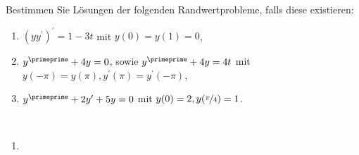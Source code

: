 \begin{exercise}
Bestimmen Sie Lösungen der folgenden Randwertprobleme, falls diese existieren:
\begin{enumerate}[label = \textbf{\alph*)}]
  \item $(yy^{\prime})^{\prime} = 1 - 3t$ mit $y(0) = y(1) = 0$,
  \item $y^{\primeprime} + 4y = 0$, sowie $y^{\primeprime} + 4y = 4t$ mit
  $y(-\pi) = y(\pi), y^{\prime}(\pi) = y^{\prime}(-\pi)$,
  \item $y^{\primeprime} + 2y^{\prime} + 5y = 0$ mit $y(0) = 2, y(\nicefrac{\pi}{4}) = 1$.
\end{enumerate}
\end{exercise}
\begin{solution}
\leavevmode \\
\begin{enumerate}[label = \textbf{\alph*)}]
  \item
\end{enumerate}
\end{solution}
